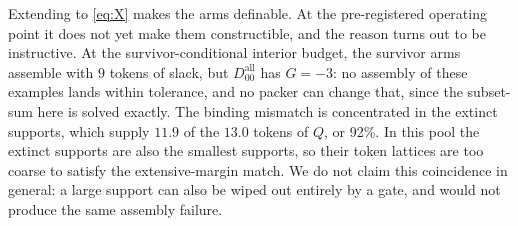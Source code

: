 \documentclass[10pt,twocolumn]{article}
\begin{document}
Extending to \eqref{eq:X} makes the arms definable. At the pre-registered operating point it does
not yet make them constructible, and the reason turns out to be instructive. At the
survivor-conditional interior budget, the survivor arms assemble with $9$ tokens of slack, but
$D_{00}^{\mathrm{all}}$ has $G=-3$: no assembly of these examples lands within tolerance, and no
packer can change that, since the subset-sum here is solved exactly. The binding mismatch is
concentrated in the extinct supports, which supply $11.9$ of the $13.0$ tokens of $Q$, or 92\%.
In this pool the extinct supports are also the smallest supports, so their token lattices are
too coarse to satisfy the extensive-margin match. We do not claim this coincidence in general: a
large support can also be wiped out entirely by a gate, and would not produce the same assembly
failure.
\end{document}
